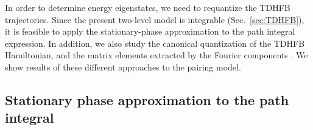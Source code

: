 \documentclass[%
superscriptaddress,
preprint,
showpacs,
nofootinbib,
amsmath,amssymb,
prc,
floatfix ]%
{revtex4-1}
\begin{document}
In order to determine energy eigenstates,
we need to requantize the TDHFB trajectories.
Since the present two-level model is integrable (Sec.~\ref{sec:TDHFB}),
it is feasible to apply the stationary-phase approximation to
the path integral expression.
In addition, we also study the canonical quantization of the TDHFB
Hamiltonian, and the matrix elements extracted by the Fourier components
\cite{CDS84}.
We show results of these different approaches to the pairing model.


\subsection{Stationary phase approximation to the path integral}
\label{sec:SPA}
\end{document}
